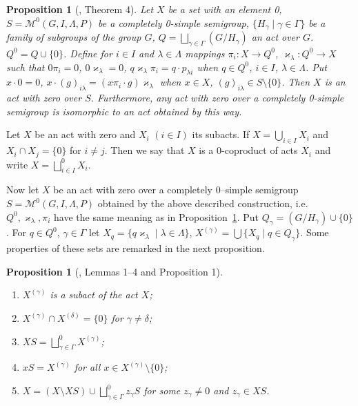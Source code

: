 \documentclass{birkau}
\numberwithin{equation}{section}
\theoremstyle{plain}
\newtheorem{proposition}[theorem]{Proposition}
\theoremstyle{definition}
\begin{document}
	\begin{proposition}[\cite{avdeev}, Theorem 4] \label{pr02}
	    Let $X$ be a set with an element 0, $S=\mathcal{M}^0(G,I,\Lambda,P)$ be a completely 0-simple semigroup, $\{ H_\gamma \mid \gamma \in \Gamma \}$ be a family of subgroups of the group $G$, $ Q = \bigsqcup_{\gamma \in \Gamma} (G/H_\gamma) $ an act over $G$. $Q^0 = Q \cup \{0\}$. Define for $i \in I$ and $\lambda \in \Lambda$ mappings $\pi_i:X \rightarrow Q^0$, $\varkappa_\lambda: Q^0 \rightarrow X$ such that $0\pi_i = 0$, $0\varkappa_\lambda = 0$, $q \varkappa_\lambda \pi_i = q \cdot p_{\lambda i}$ when $ q \in Q^0$, $i \in I$, $\lambda \in \Lambda$. Put $x \cdot 0 = 0$, $x \cdot (g)_{i \lambda} = (x \pi_i \cdot g)\varkappa_{\lambda}$ when $x \in X$, $(g)_{i \lambda} \in S \setminus \{0\}$. Then $X$ is an act with zero over $S$. Furthermore, any act with zero over a completely 0-simple semigroup is isomorphic to an act obtained by this way.
	\end{proposition}
	
	Let $X$ be an act with zero and $X_i$ $(i \in I)$ its subacts. If $X = \bigcup_{i \in I} X_i$ and $X_i \cap X_j = \{0\}$ for $i \neq j$. Then we say that $X$ is a 0-coproduct of acts $X_i$ and write $X = \bigsqcup_{i \in I}^0 X_i$.
	
	Now let $X$ be an act with zero over a completely 0--simple semigroup $S=\mathcal{M}^0(G,I,\Lambda,P)$ obtained by the above described construction, i.e. $Q^0,\varkappa_\lambda,\pi_i$ have the same meaning as in Proposition~\ref{pr02}. Put $Q_\gamma = (G/H_\gamma) \cup \{0\}$. For $q \in Q^0$, $\gamma \in \Gamma$ let $X_q = \{q\varkappa_\lambda \mid \lambda \in \Lambda \}$, $X^{(\gamma)} = \bigcup\{X_q \mid q \in Q_{\gamma}\}$. Some properties of these sets are remarked in the next proposition.
	
	\begin{proposition}[\cite{avdeev}, Lemmas 1--4 and Proposition 1] \label{pr03}
		\
		\begin{enumerate}
			\item[(1)] $X^{(\gamma)}$ is a subact of the act $X$;
			\item[(2)] $X^{(\gamma)} \cap X^{(\delta)} = \{0\}$ for $\gamma \neq \delta$;
			\item[(3)] $XS = \bigsqcup_{\gamma \in \Gamma}^0 X^{(\gamma)}$;
			\item[(4)] $xS = X^{(\gamma)}$ for all $x \in X^{(\gamma)} \setminus \{0\}$;
			\item[(5)] $X = (X \setminus XS) \cup \bigsqcup_{\gamma \in \Gamma}^0 z_{\gamma} S $ for some $z_\gamma \neq 0$ and $z_\gamma \in XS$.
		\end{enumerate}
	\end{proposition}
	
\end{document}
